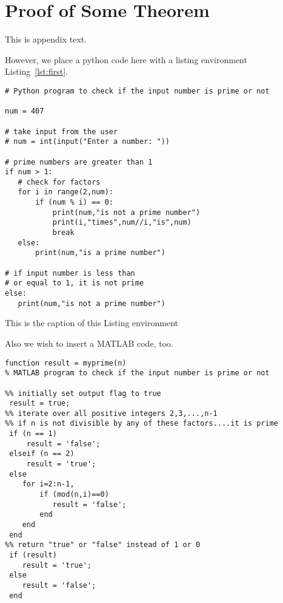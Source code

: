 \chapter{Proof of Some Theorem}
\label{app:mintedCodes}

This is appendix text.






However, we place a python code here with a listing environment
Listing~\ref{lst:first}.	

\begin{listing}	
\begin{verbatim}
# Python program to check if the input number is prime or not

num = 407

# take input from the user
# num = int(input("Enter a number: "))

# prime numbers are greater than 1
if num > 1:
   # check for factors
   for i in range(2,num):
       if (num % i) == 0:
           print(num,"is not a prime number")
           print(i,"times",num//i,"is",num)
           break
   else:
       print(num,"is a prime number")
       
# if input number is less than
# or equal to 1, it is not prime
else:
   print(num,"is not a prime number")
\end{verbatim}
\caption{This is the caption of this Listing environment\label{lst:first}}
\end{listing}

Also we wish to insert a MATLAB code, too.

\begin{verbatim}
function result = myprime(n)
% MATLAB program to check if the input number is prime or not

%% initially set output flag to true
 result = true;
%% iterate over all positive integers 2,3,...,n-1
%% if n is not divisible by any of these factors....it is prime
 if (n == 1)
     result = 'false';
 elseif (n == 2)
     result = 'true';
 else 
    for i=2:n-1,
        if (mod(n,i)==0)
           result = 'false';
        end
    end
 end
%% return "true" or "false" instead of 1 or 0  
 if (result)
    result = 'true';
 else
    result = 'false';
 end
\end{verbatim}


